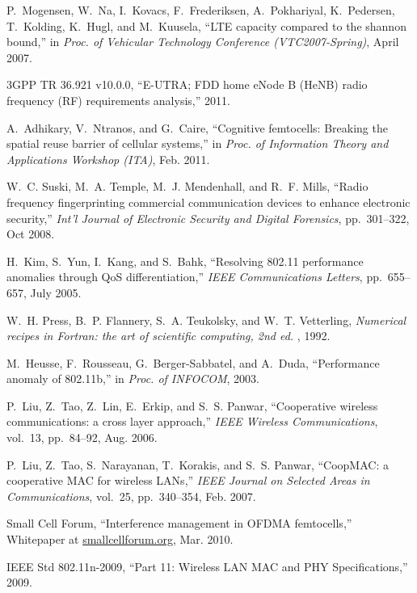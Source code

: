\documentclass[journal,final,letterpaper,10pt,doublecolumn,twoside]{IEEEtran}
\begin{document}
\begin{thebibliography}{10}
P.~Mogensen, W.~Na, I.~Kovacs, F.~Frederiksen, A.~Pokhariyal, K.~Pedersen,
  T.~Kolding, K.~Hugl, and M.~Kuusela, ``{LTE} capacity compared to the shannon
  bound,'' in {\em Proc. of Vehicular Technology Conference (VTC2007-Spring)},
  April 2007.

{3GPP TR 36.921 v10.0.0}, ``{E-UTRA; FDD} home {eNode B (HeNB)} radio frequency
  {(RF)} requirements analysis,'' 2011.

A.~Adhikary, V.~Ntranos, and G.~Caire, ``Cognitive femtocells: Breaking the
  spatial reuse barrier of cellular systems,'' in {\em {Proc. of Information
  Theory and Applications Workshop (ITA)}}, Feb. 2011.

W.~C. Suski, M.~A. Temple, M.~J. Mendenhall, and R.~F. Mills, ``Radio frequency
  fingerprinting commercial communication devices to enhance electronic
  security,'' {\em Int'l Journal of Electronic Security and Digital Forensics},
  pp.~301--322, Oct 2008.

H.~Kim, S.~Yun, I.~Kang, and S.~Bahk, ``{Resolving 802.11 performance anomalies
  through QoS differentiation},'' {\em IEEE Communications Letters},
  pp.~655--657, July 2005.

W.~H. Press, B.~P. Flannery, S.~A. Teukolsky, and W.~T. Vetterling, {\em
  {Numerical recipes in Fortran: the art of scientific computing, 2nd ed.}}
, 1992.

M.~Heusse, F.~Rousseau, G.~Berger-Sabbatel, and A.~Duda, ``{Performance anomaly
  of 802.11b},'' in {\em {Proc. of INFOCOM}}, 2003.

P.~Liu, Z.~Tao, Z.~Lin, E.~Erkip, and S.~S. Panwar, ``Cooperative wireless
  communications: a cross layer approach,'' {\em IEEE Wireless Communications},
  vol.~13, pp.~84--92, Aug. 2006.

P.~Liu, Z.~Tao, S.~Narayanan, T.~Korakis, and S.~S. Panwar, ``{CoopMAC: a
  cooperative MAC for wireless LANs},'' {\em {IEEE Journal on Selected Areas in
  Communications}}, vol.~25, pp.~340--354, Feb. 2007.

{Small Cell Forum}, ``Interference management in {OFDMA} femtocells,''
  Whitepaper at \url{smallcellforum.org}, Mar. 2010.

{IEEE Std 802.11n-2009}, ``{Part 11: Wireless LAN MAC and PHY
  Specifications},'' 2009.

\end{thebibliography}
\end{document}
